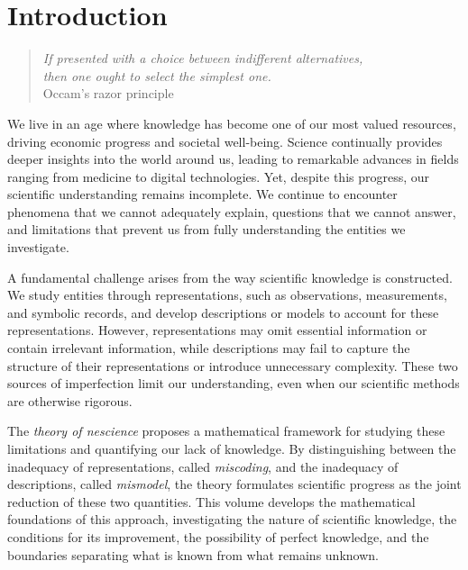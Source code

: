 %
%


\chapter{Introduction}
\label{chap:Introduction}

\begin{quote}
\begin{flushright}
\emph{If presented with a choice between indifferent alternatives,\\
then one ought to select the simplest one.}\\
Occam's razor principle 
\end{flushright}
\end{quote}
\bigskip

We live in an age where knowledge has become one of our most valued resources, driving economic progress and societal well-being. Science continually provides deeper insights into the world around us, leading to remarkable advances in fields ranging from medicine to digital technologies. Yet, despite this progress, our scientific understanding remains incomplete. We continue to encounter phenomena that we cannot adequately explain, questions that we cannot answer, and limitations that prevent us from fully understanding the entities we investigate.

A fundamental challenge arises from the way scientific knowledge is constructed. We study entities through representations, such as observations, measurements, and symbolic records, and develop descriptions or models to account for these representations. However, representations may omit essential information or contain irrelevant information, while descriptions may fail to capture the structure of their representations or introduce unnecessary complexity. These two sources of imperfection limit our understanding, even when our scientific methods are otherwise rigorous.

The \emph{theory of nescience} proposes a mathematical framework for studying these limitations and quantifying our lack of knowledge. By distinguishing between the inadequacy of representations, called \emph{miscoding}, and the inadequacy of descriptions, called \emph{mismodel}, the theory formulates scientific progress as the joint reduction of these two quantities. This volume develops the mathematical foundations of this approach, investigating the nature of scientific knowledge, the conditions for its improvement, the possibility of perfect knowledge, and the boundaries separating what is known from what remains unknown.

